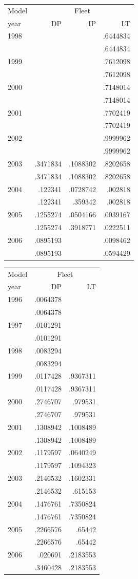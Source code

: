 \begin{tabular}{lrrr}
\toprule
Model & \multicolumn{3}{c}{Fleet} \\
year & DP & IP & LT \\
\midrule
1998 &  &  & .6444834 \\
 &  &  & .6444834 \\
1999 &  &  & .7612098 \\
 &  &  & .7612098 \\
2000 &  &  & .7148014 \\
 &  &  & .7148014 \\
2001 &  &  & .7702419 \\
 &  &  & .7702419 \\
2002 &  &  & .9999962 \\
 &  &  & .9999962 \\
2003 & .3471834 & .1088302 & .8202658 \\
 & .3471834 & .1088302 & .8202658 \\
2004 & .122341 & .0728742 & .002818 \\
 & .122341 & .359342 & .002818 \\
2005 & .1255274 & .0504166 & .0039167 \\
 & .1255274 & .3918771 & .0222511 \\
2006 & .0895193 &  & .0098462 \\
 & .0895193 &  & .0594429 \\
\bottomrule
\end{tabular}

\begin{tabular}{lrr}
\toprule
Model & \multicolumn{2}{c}{Fleet} \\
year & DP & LT \\
\midrule
1996 & .0064378 &  \\
 & .0064378 &  \\
1997 & .0101291 &  \\
 & .0101291 &  \\
1998 & .0083294 &  \\
 & .0083294 &  \\
1999 & .0117428 & .9367311 \\
 & .0117428 & .9367311 \\
2000 & .2746707 & .979531 \\
 & .2746707 & .979531 \\
2001 & .1308942 & .1008489 \\
 & .1308942 & .1008489 \\
2002 & .1179597 & .0640249 \\
 & .1179597 & .1094323 \\
2003 & .2146532 & .1602331 \\
 & .2146532 & .615153 \\
2004 & .1476761 & .7350824 \\
 & .1476761 & .7350824 \\
2005 & .2266576 & .65442 \\
 & .2266576 & .65442 \\
2006 & .020691 & .2183553 \\
 & .3460428 & .2183553 \\
\bottomrule
\end{tabular}

